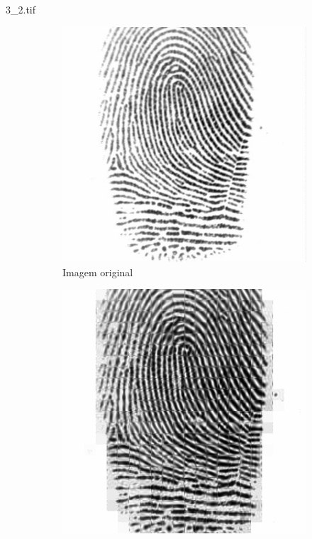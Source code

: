 \documentclass{beamer}
\begin{document}
    \begin{frame}{3\_2.tif}
        \begin{figure}
            \centering
            \begin{subfigure}[!ht]{0.32\textwidth}
                \includegraphics[width=\columnwidth]{Fingerprints/3_2.jpg}
                \caption{Imagem original}
            \end{subfigure}
            \begin{subfigure}[!ht]{0.32\textwidth}
                \includegraphics[width=\columnwidth]{Fingerprints/3_2_intermediate.jpg}

\end{subfigure}
\end{figure}
\end{frame}
\end{document}
